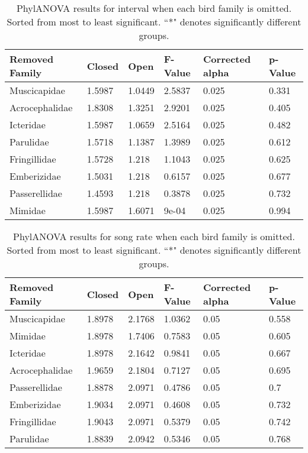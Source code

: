 \documentclass[a4paper,12pt]{article}
\begin{document}
\begin{table}[ht]
\caption{PhylANOVA results for interval when each bird family is omitted.  Sorted from most to least significant.  ``*" denotes significantly different groups.}
\centering
\begin{tabular}{llllll}
  \hline
Removed Family & Closed & Open & F-Value & Corrected alpha & p-Value \\ 
  \hline
Muscicapidae & 1.5987 & 1.0449 & 2.5837 & 0.025 & 0.331 \\ 
  Acrocephalidae & 1.8308 & 1.3251 & 2.9201 & 0.025 & 0.405 \\ 
  Icteridae & 1.5987 & 1.0659 & 2.5164 & 0.025 & 0.482 \\ 
  Parulidae & 1.5718 & 1.1387 & 1.3989 & 0.025 & 0.612 \\ 
  Fringillidae & 1.5728 & 1.218 & 1.1043 & 0.025 & 0.625 \\ 
  Emberizidae & 1.5031 & 1.218 & 0.6157 & 0.025 & 0.677 \\ 
  Passerellidae & 1.4593 & 1.218 & 0.3878 & 0.025 & 0.732 \\ 
  Mimidae & 1.5987 & 1.6071 & 9e-04 & 0.025 & 0.994 \\ 
   \hline
\end{tabular}
\end{table}

\begin{table}[ht]
\caption{PhylANOVA results for song rate when each bird family is omitted.  Sorted from most to least significant.  ``*" denotes significantly different groups.}
\centering
\begin{tabular}{llllll}
  \hline
Removed Family & Closed & Open & F-Value & Corrected alpha & p-Value \\ 
  \hline
Muscicapidae & 1.8978 & 2.1768 & 1.0362 & 0.05 & 0.558 \\ 
  Mimidae & 1.8978 & 1.7406 & 0.7583 & 0.05 & 0.605 \\ 
  Icteridae & 1.8978 & 2.1642 & 0.9841 & 0.05 & 0.667 \\ 
  Acrocephalidae & 1.9659 & 2.1804 & 0.7127 & 0.05 & 0.695 \\ 
  Passerellidae & 1.8878 & 2.0971 & 0.4786 & 0.05 & 0.7 \\ 
  Emberizidae & 1.9034 & 2.0971 & 0.4608 & 0.05 & 0.732 \\ 
  Fringillidae & 1.9043 & 2.0971 & 0.5379 & 0.05 & 0.742 \\ 
  Parulidae & 1.8839 & 2.0942 & 0.5346 & 0.05 & 0.768 \\ 
   \hline
\end{tabular}
\end{table}
\end{document}
